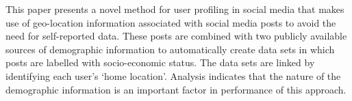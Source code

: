 This paper presents a novel method for user profiling in social media that makes use of geo-location information associated with social media posts to avoid the need for self-reported data. These posts are combined with two publicly available sources of demographic information to automatically create data sets in which posts are labelled with socio-economic status. The data sets are linked by identifying each user's `home location'. Analysis indicates that the nature of the demographic information is an important factor in performance of this approach.
